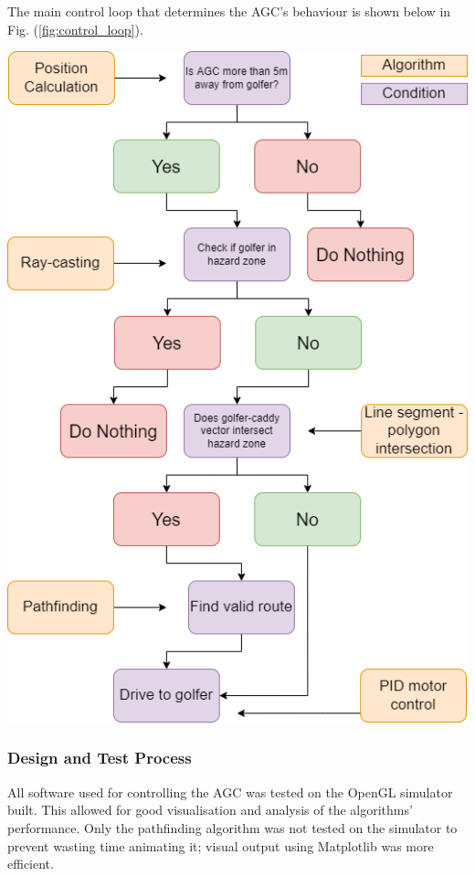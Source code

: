 \documentclass[11pt,landscape]{article}
\newenvironment{Figure}
  {\par\medskip\noindent\minipage{\linewidth}}
  {\endminipage\par\medskip}
\begin{document}
\begin{multicols}{3}
The main control loop that determines the AGC's behaviour is shown below in Fig.
(\ref{fig:control_loop}).
\begin{Figure}
\begin{mdframed}
    \begin{center}
        \includegraphics[width=\textwidth]{control_loop.png}
    \end{center}
\end{mdframed}
\label{fig:control_loop}
\end{Figure}
\subsubsection{Design and Test Process}
All software used for controlling the AGC was tested on the OpenGL simulator
built. This allowed for good visualisation and analysis of the algorithms'
performance. Only the pathfinding algorithm was not tested on the simulator to
prevent wasting time animating it; visual output using Matplotlib was more
efficient.


\end{multicols}
\end{document}
